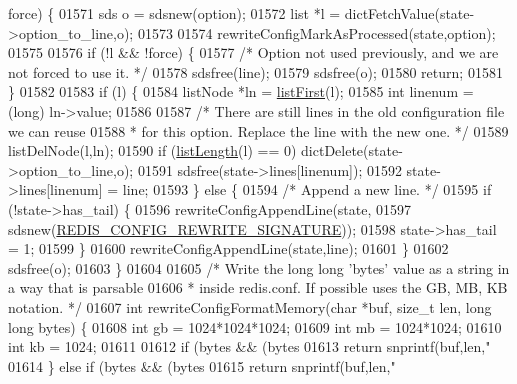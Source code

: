 \begin{DoxyCode}
{{{{{{{{{{{{{{      force) \{
01571     sds o = sdsnew(option);
01572     list *l = dictFetchValue(state->option\_to\_line,o);
01573 
01574     rewriteConfigMarkAsProcessed(state,option);
01575 
01576     \textcolor{keywordflow}{if} (!l && !force) \{
01577         \textcolor{comment}{/* Option not used previously, and we are not forced to use it. */}
01578         sdsfree(line);
01579         sdsfree(o);
01580         \textcolor{keywordflow}{return};
01581     \}
01582 
01583     \textcolor{keywordflow}{if} (l) \{
01584         listNode *ln = \hyperlink{adlist_8h_aa8dc514bbe217bb2e87c1c77cfa84690}{listFirst}(l);
01585         \textcolor{keywordtype}{int} linenum = (\textcolor{keywordtype}{long}) ln->value;
01586 
01587         \textcolor{comment}{/* There are still lines in the old configuration file we can reuse}
01588 \textcolor{comment}{         * for this option. Replace the line with the new one. */}
01589         listDelNode(l,ln);
01590         \textcolor{keywordflow}{if} (\hyperlink{adlist_8h_afde0ab079f934670e82119b43120e94b}{listLength}(l) == 0) dictDelete(state->option\_to\_line,o);
01591         sdsfree(state->lines[linenum]);
01592         state->lines[linenum] = line;
01593     \} \textcolor{keywordflow}{else} \{
01594         \textcolor{comment}{/* Append a new line. */}
01595         \textcolor{keywordflow}{if} (!state->has\_tail) \{
01596             rewriteConfigAppendLine(state,
01597                 sdsnew(\hyperlink{config_8c_aaa12a1e51316cd3b3e52143ec8d03aeb}{REDIS\_CONFIG\_REWRITE\_SIGNATURE}));
01598             state->has\_tail = 1;
01599         \}
01600         rewriteConfigAppendLine(state,line);
01601     \}
01602     sdsfree(o);
01603 \}
01604 
01605 \textcolor{comment}{/* Write the long long 'bytes' value as a string in a way that is parsable}
01606 \textcolor{comment}{ * inside redis.conf. If possible uses the GB, MB, KB notation. */}
01607 \textcolor{keywordtype}{int} rewriteConfigFormatMemory(\textcolor{keywordtype}{char} *buf, size\_t len, \textcolor{keywordtype}{long} \textcolor{keywordtype}{long} bytes) \{
01608     \textcolor{keywordtype}{int} gb = 1024*1024*1024;
01609     \textcolor{keywordtype}{int} mb = 1024*1024;
01610     \textcolor{keywordtype}{int} kb = 1024;
01611 
01612     \textcolor{keywordflow}{if} (bytes && (bytes %
01613         \textcolor{keywordflow}{return} snprintf(buf,len,\textcolor{stringliteral}{"%
01614     \} \textcolor{keywordflow}{else} \textcolor{keywordflow}{if} (bytes && (bytes %
01615         \textcolor{keywordflow}{return} snprintf(buf,len,\textcolor{stringliteral}{"%
}}}}}}}}}}}}}}}}
\end{DoxyCode}
